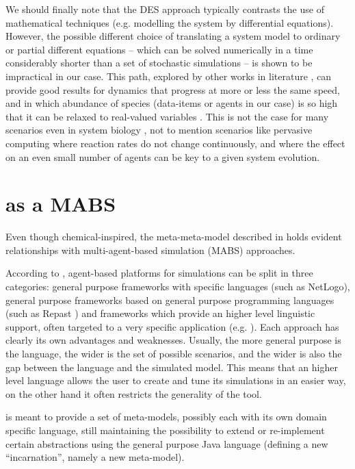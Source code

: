 \documentclass[12pt,a4paper,twoside,openright]{book}
\begin{document}
We should finally note that the DES approach typically contrasts the use of mathematical techniques (e.g. modelling the system by differential equations).
%
However, the possible different choice of translating a system model to ordinary or partial different equations -- which can be solved numerically in a time considerably shorter than a set of stochastic simulations -- is shown to be impractical in our case.
%
This path, explored by other works in literature \cite{MallavarapuInterface2008}, can provide good results for dynamics that progress at more or less the same speed, and in which abundance of species (data-items or agents in our case) is so high that it can be relaxed to real-valued variables \cite{EwaldJOS2007}.
%
This is not the case for many scenarios even in system biology \cite{Cowan2000, UhrmacherWSC2005}, not to mention scenarios like pervasive computing where reaction rates do not change continuously, and where the effect on an even small number of agents can be key to a given system evolution.

\section{\alchemist{} as a MABS}

Even though chemical-inspired, the meta-meta-model described in  holds evident relationships with multi-agent-based simulation (MABS) approaches.

According to \cite{BandiniJASSS2009}, agent-based platforms for simulations can be split in three categories: general purpose frameworks with specific languages (such as NetLogo), general purpose frameworks based on general purpose programming languages (such as Repast \cite{repast}) and frameworks which provide an higher level linguistic support, often targeted to a very specific application (e.g. \cite{WeynsAAMAS2006}).
%
Each approach has clearly its own advantages and weaknesses.
%
Usually, the more general purpose is the language, the wider is the set of possible scenarios, and the wider is also the gap between the language and the simulated model.
%
This means that an higher level language allows the user to create and tune its simulations in an easier way, on the other hand it often restricts the generality of the tool. 

\alchemist{} is meant to provide a set of meta-models, possibly each with its own domain specific language, still maintaining the possibility to extend or re-implement certain abstractions using the general purpose Java language (defining a new ``incarnation'', namely a new meta-model).
\end{document}
